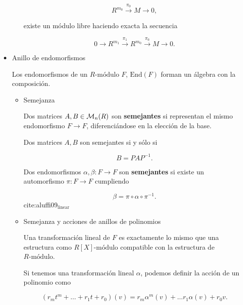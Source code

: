 \documentclass[11pt]{article}
\begin{document}
\begin{itemize}
\begin{itemize}
\begin{proposition}
\[
R^{m_0} \overset{\pi_0} \longrightarrow M \longrightarrow 0,
\]

existe un módulo libre haciendo exacta la secuencia

\[
0 \longrightarrow 
R^{m_1} \overset{\pi_1} \longrightarrow
R^{m_0} \overset{\pi_0} \longrightarrow
M \longrightarrow
0.\]
\end{proposition}
\end{itemize}

\item Anillo de endomorfismos
\label{sec-7-5-3-6}
\begin{proposition}
Los endomorfismos de un $R\text{-módulo}$ $F$, $\mathrm{End}(F)$ forman un álgebra con la
composición.
\end{proposition}

\begin{itemize}
\item Semejanza
\label{sec-7-5-3-6-1}
\begin{definition}
Dos matrices $A,B \in {\cal M}_n(R)$ son \textbf{semejantes} si representan el mismo
endomorfismo $F \to F$, diferenciándose en la elección de la base.
\end{definition}

\begin{proposition}
Dos matrices $A,B$ son semejantes si y sólo si

\[
B = PAP^{-1}.
\]
\end{proposition}

\begin{definition}
Dos endomorfismos $\alpha,\beta \colon F \to F$ son \textbf{semejantes} si existe un
automorfismo $\pi \colon F \to F$ cumpliendo

\[
\beta = \pi \circ \alpha \circ \pi^{-1}.
\] cite:aluffi09$_{\text{linear}}$
\end{definition}

\item Semejanza y acciones de anillos de polinomios
\label{sec-7-5-3-6-2}
\begin{proposition}
Una transformación lineal de $F$ es exactamente lo mismo que una estructura
como $R[X]\text{-módulo}$ compatible con la estructura de $R\text{-módulo}$.
\end{proposition}

Si tenemos una transformación lineal $\alpha$, podemos definir la acción de
un polinomio como

\[
\left( r_mt^m + \dots + r_1t + r_0 \right)(v) =
r_{m}\alpha^m(v) + \dots r_1\alpha(v) + r_0v.
\]


\end{itemize}
\end{itemize}
\end{document}
